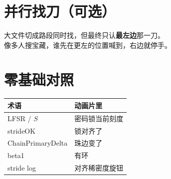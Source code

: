 \section{并行找刀（可选）}

大文件切成路段同时找，但最终只认\textbf{最左边}那一刀。\\
像多人搜宝藏，谁先在更左的位置喊到，右边就停手。

\section{零基础对照}

\begin{center}
\begin{tabular}{@{}ll@{}}
\toprule
术语 & 动画片里 \\
\midrule
LFSR / $S$ & 密码锁当前刻度 \\
strideOK & 锁对齐了 \\
ChainPrimaryDelta & 珠边变了 \\
beta1 & 有环 \\
stride log & 对齐稀密度旋钮 \\
\bottomrule
\end{tabular}
\end{center}
